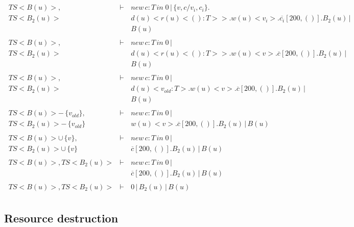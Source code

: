 \begin{eqnarray*}
 \               &        &          \\
 \ TS<B(u)>,         &\vdash\,& new\,c:T\,in\;0\,|\,\{v,c/v_i,c_i\}.\\
 \ TS<B_2(u)>              &\,      & d(u)<r(u)<():T>>.w(u)<v_i>.\overline{c_i}[200,()].B_2(u)\,|\\
 \               &        & B(u)\\
 \               &        &          \\
 \ TS<B(u)>,         &\vdash\,& new\,c:T\,in\;0\,|\,\\
 \ TS<B_2(u)>              &      & d(u)<r(u)<():T>>.w(u)<v>.\overline{c}[200,()].B_2(u)\,|\\
 \               &        & B(u)\\
 \               &        &          \\
 \ TS<B(u)>,         &\vdash\,& new\,c:T\,in\;0\,|\,\\
 \ TS<B_2(u)>              &      & d(u)<v_{old}:T>.w(u)<v>.\overline{c}[200,()].B_2(u)\,|\\
 \               &        &  B(u)\\
 \               &        &          \\
 \ TS<B(u)> - \,\{ v_{old} \},        &\vdash\,& new\,c:T\,in\;0\,|\,\\
 \ TS<B_2(u)> - \,\{ v_{old} \}              &      & w(u)<v>.\overline{c}[200,()].B_2(u)\,|\,B(u)\\
 \               &        &          \\
 \ TS<B(u)> \cup \,\{v\},        &\vdash\,& new\,c:T\,in\;0\,|\,\\
 \ TS<B_2(u)> \cup \,\{v\}              &      & \overline{c}[200,()].B_2(u)\,|\,B(u)\\
 \               &        &          \\
 \ TS<B(u)>,TS<B_2(u)>         &\vdash\,& new\,c:T\,in\;0\,|\,\\
 \               &      & \overline{c}[200,()].B_2(u)\,|\,B(u)\\
 \               &       &          \\
 \ TS<B(u)>,TS<B_2(u)>         &\vdash\,& 0\,|\,B_2(u)\,|\,B(u)\\
\end{eqnarray*}


\subsection{Resource destruction}

